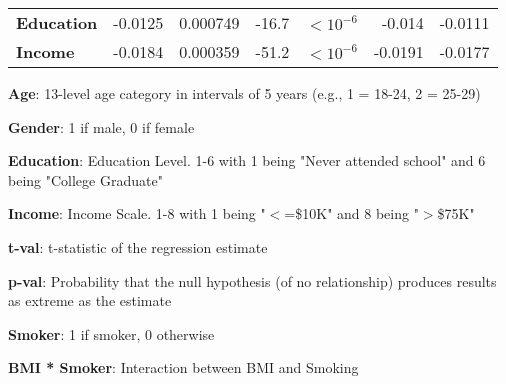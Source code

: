 \documentclass[11pt]{article}
\begin{document}
\begin{table}[h]
\begin{threeparttable}
{\begin{tabular}{lrrrlrr}
\textbf{Education} & \raisebox{2ex}{\hypertarget{C7a}{}}-0.0125 & \raisebox{2ex}{\hypertarget{C7b}{}}0.000749 & \raisebox{2ex}{\hypertarget{C7c}{}}-16.7 & $<$\raisebox{2ex}{\hypertarget{C7d}{}}$10^{-6}$ & \raisebox{2ex}{\hypertarget{C7e}{}}-0.014 & \raisebox{2ex}{\hypertarget{C7f}{}}-0.0111 \\
\textbf{Income} & \raisebox{2ex}{\hypertarget{C8a}{}}-0.0184 & \raisebox{2ex}{\hypertarget{C8b}{}}0.000359 & \raisebox{2ex}{\hypertarget{C8c}{}}-51.2 & $<$\raisebox{2ex}{\hypertarget{C8d}{}}$10^{-6}$ & \raisebox{2ex}{\hypertarget{C8e}{}}-0.0191 & \raisebox{2ex}{\hypertarget{C8f}{}}-0.0177 \\
\bottomrule
\end{tabular}}
\begin{tablenotes}
\footnotesize
\item \textbf{Age}: 13-level age category in intervals of 5 years (e.g., 1 = 18-24, 2 = 25-29)
\item \textbf{Gender}: 1 if male, 0 if female
\item \textbf{Education}: Education Level. 1-6 with 1 being "Never attended school" and 6 being "College Graduate"
\item \textbf{Income}: Income Scale. 1-8 with 1 being "$<$=\$10K" and 8 being "$>$\$75K"
\item \textbf{t-val}: t-statistic of the regression estimate
\item \textbf{p-val}: Probability that the null hypothesis (of no relationship) produces results as extreme as the estimate
\item \textbf{Smoker}: 1 if smoker, 0 otherwise
\item \textbf{BMI * Smoker}: Interaction between BMI and Smoking
\end{tablenotes}
\end{threeparttable}
\end{table}
\end{document}
